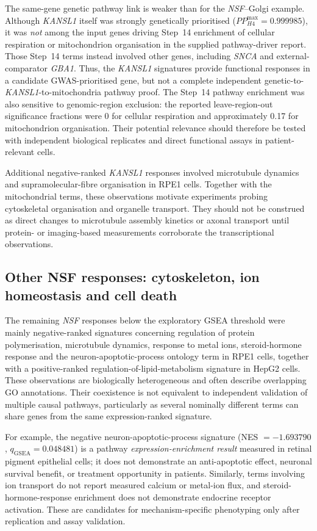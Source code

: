 \documentclass[11pt,a4paper]{article}
\begin{document}
The same-gene genetic pathway link is weaker than for the \textit{NSF}--Golgi example. Although \textit{KANSL1} itself was strongly genetically prioritised ($PP_{H4}^{\max}=0.999985$), it was \emph{not} among the input genes driving Step~14 enrichment of cellular respiration or mitochondrion organisation in the supplied pathway-driver report. Those Step~14 terms instead involved other genes, including \textit{SNCA} and external-comparator \textit{GBA1}. Thus, the \textit{KANSL1} signatures provide functional responses in a candidate GWAS-prioritised gene, but not a complete independent genetic-to-\textit{KANSL1}-to-mitochondria pathway proof. The Step~14 pathway enrichment was also sensitive to genomic-region exclusion: the reported leave-region-out significance fractions were 0 for cellular respiration and approximately 0.17 for mitochondrion organisation. Their potential relevance should therefore be tested with independent biological replicates and direct functional assays in patient-relevant cells.

Additional negative-ranked \textit{KANSL1} responses involved microtubule dynamics and supramolecular-fibre organisation in RPE1 cells. Together with the mitochondrial terms, these observations motivate experiments probing cytoskeletal organisation and organelle transport. They should not be construed as direct changes to microtubule assembly kinetics or axonal transport until protein- or imaging-based measurements corroborate the transcriptional observations.

\subsection{Other NSF responses: cytoskeleton, ion homeostasis and cell death}
\label{subsec:discussion_secondary}
The remaining \textit{NSF} responses below the exploratory GSEA threshold were mainly negative-ranked signatures concerning regulation of protein polymerisation, microtubule dynamics, response to metal ions, steroid-hormone response and the neuron-apoptotic-process ontology term in RPE1 cells, together with a positive-ranked regulation-of-lipid-metabolism signature in HepG2 cells. These observations are biologically heterogeneous and often describe overlapping GO annotations. Their coexistence is not equivalent to independent validation of multiple causal pathways, particularly as several nominally different terms can share genes from the same expression-ranked signature.

For example, the negative neuron-apoptotic-process signature (NES $=-1.693790$, $q_{\mathrm{GSEA}}=0.048481$) is a pathway \emph{expression-enrichment result} measured in retinal pigment epithelial cells; it does not demonstrate an anti-apoptotic effect, neuronal survival benefit, or treatment opportunity in patients. Similarly, terms involving ion transport do not report measured calcium or metal-ion flux, and steroid-hormone-response enrichment does not demonstrate endocrine receptor activation. These are candidates for mechanism-specific phenotyping only after replication and assay validation.
\end{document}
